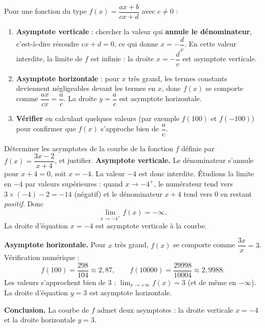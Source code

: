 \documentclass[11pt]{article}
\begin{document}
\begin{methode}
Pour une fonction du type $f(x) = \dfrac{ax + b}{cx + d}$ avec $c \neq 0$ :
\begin{enumerate}
\item \textbf{Asymptote verticale} : chercher la valeur qui \textbf{annule le dénominateur}, c'est-à-dire résoudre $cx + d = 0$, ce qui donne $x = -\dfrac{d}{c}$. En cette valeur interdite, la limite de $f$ est infinie : la droite $x = -\dfrac{d}{c}$ est asymptote verticale.
\item \textbf{Asymptote horizontale} : pour $x$ très grand, les termes constants deviennent négligeables devant les termes en $x$, donc $f(x)$ se comporte comme $\dfrac{ax}{cx} = \dfrac{a}{c}$. La droite $y = \dfrac{a}{c}$ est asymptote horizontale.
\item \textbf{Vérifier} en calculant quelques valeurs (par exemple $f(100)$ et $f(-100)$) pour confirmer que $f(x)$ s'approche bien de $\dfrac{a}{c}$.
\end{enumerate}
\end{methode}

\begin{exoresolu}[Asymptotes de $f(x) = \dfrac{3x - 2}{x + 4}$]
Déterminer les asymptotes de la courbe de la fonction $f$ définie par $f(x) = \dfrac{3x-2}{x+4}$, et justifier.
\tcblower
\textbf{Asymptote verticale.} Le dénominateur s'annule pour $x + 4 = 0$, soit $x = -4$. La valeur $-4$ est donc interdite. Étudions la limite en $-4$ par valeurs supérieures : quand $x \to -4^+$, le numérateur tend vers $3 \times (-4) - 2 = -14$ (négatif) et le dénominateur $x + 4$ tend vers $0$ en restant \emph{positif}. Donc
\[ \lim_{x \to -4^+} f(x) = -\infty. \]
La droite d'équation $x = -4$ est asymptote verticale à la courbe.

\textbf{Asymptote horizontale.} Pour $x$ très grand, $f(x)$ se comporte comme $\dfrac{3x}{x} = 3$. Vérification numérique :
\[ f(100) = \frac{298}{104} \approx 2{,}87, \qquad f(\num{10000}) = \frac{\num{29998}}{\num{10004}} \approx 2{,}9988. \]
Les valeurs s'approchent bien de $3$ : $\displaystyle\lim_{x \to +\infty} f(x) = 3$ (et de même en $-\infty$). La droite d'équation $y = 3$ est asymptote horizontale.

\textbf{Conclusion.} La courbe de $f$ admet deux asymptotes : la droite verticale $x = -4$ et la droite horizontale $y = 3$.
\end{exoresolu}
\end{document}
